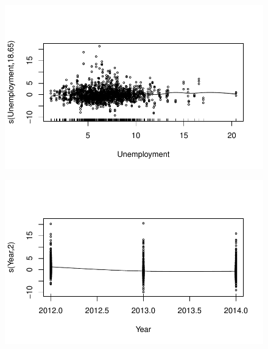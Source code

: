 \documentclass[
  letterpaper,
  DIV=11,
  numbers=noendperiod]{scrartcl}
\begin{document}
\begin{figure}[H]

{\centering \includegraphics{Group34Coursework_files/figure-pdf/unnamed-chunk-10-7.pdf}

}

\end{figure}

\begin{figure}[H]

{\centering \includegraphics{Group34Coursework_files/figure-pdf/unnamed-chunk-10-8.pdf}

}

\end{figure}
\end{document}
